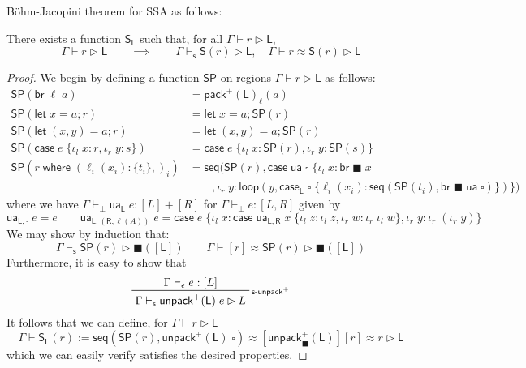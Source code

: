 \documentclass[acmsmall,screen,review]{acmart}
\newcommand{\ms}[1]{\ensuremath{\mathsf{#1}}}
\newcommand{\lto}{:}
\newcommand{\linl}[1]{\iota_l\;{#1}}
\newcommand{\linr}[1]{\iota_r\;{#1}}
\newcommand{\caseexpr}[5]{\ms{case}\;#1\;\{\linl{#2} \lto #3, \linr{#4} \lto #5\}}
\newcommand{\letstmt}[3]{\ensuremath{\ms{let}\;#1 = #2; #3}}
\newcommand{\brb}[2]{\ms{br}\;#1\;#2}
\newcommand{\casestmt}[5]{\ms{case}\;#1\;\{\linl{#2} \lto #3, \linr{#4} \lto #5\}}
\newcommand{\where}[2]{#1\;\ms{where}\;#2}
\newcommand{\wbranch}[3]{#1(#2) \lto \{#3\}}
\newcommand{\rle}[1]{{\scriptsize\textsf{#1}}}
\newcommand{\hasty}[4]{#1 \vdash_{#2} #3: {#4}}
\newcommand{\haslb}[3]{#1 \vdash #2 \rhd #3}
\newcommand{\shaslb}[3]{#1 \vdash_{\ms{s}} #2 \rhd #3}
\newcommand{\teqv}{\approx}
\newcommand{\lbeq}[4]{#1 \vdash #2 \teqv #3 \rhd {#4}}
\newcommand{\invar}{\square}
\newcommand{\outlb}{\blacksquare}
\begin{document}
B\"ohm-Jacopini theorem for SSA as follows:
\begin{theorem}
  There exists a function $\ms{S}_{\ms{L}}$ such that, for all $\haslb{\Gamma}{r}{\ms{L}}$,
  \begin{equation}
    \haslb{\Gamma}{r}{\ms{L}} \qquad \implies \qquad 
      \shaslb{\Gamma}{\ms{S}(r)}{\ms{L}}, \quad \lbeq{\Gamma}{r}{\ms{S}(r)}{\ms{L}}
  \end{equation}
\end{theorem}
\begin{proof}
  We begin by defining a function $\ms{SP}$ on regions $\haslb{\Gamma}{r}{\ms{L}}$ as follows:
  \begin{align*}
    \ms{SP}(\ms{br}\;\ell\;a) &= \ms{pack}^+(\ms{L})_\ell(a) \\
    \ms{SP}(\letstmt{x}{a}{r}) &= \letstmt{x}{a}{\ms{SP}(r)} \\
    \ms{SP}(\letstmt{(x, y)}{a}{r}) &= \letstmt{(x, y)}{a}{\ms{SP}(r)} \\
    \ms{SP}(\casestmt{e}{x}{r}{y}{s}) &= \casestmt{e}{x}{\ms{SP}(r)}{y}{\ms{SP}(s)} \\
    \ms{SP}(\where{r}{(\wbranch{\ell_i}{x_i}{t_i},)_i}) &=
      \ms{seq}(\ms{SP}(r), \caseexpr{\ms{ua}\;\invar}{x}{\brb{\outlb}{x}\\ & \qquad}{y}
        {\ms{loop}(y, 
        \ms{case}_{\ms{L}}\;\invar\;
          \{\ell_i(x_i) : \ms{seq}(\ms{SP}(t_i), \brb{\outlb}{\ms{ua}\;\invar)}\})})
  \end{align*}
  where we have $\hasty{\Gamma}{\bot}{\ms{ua}_{\ms{L}}\;e}{[L] + [R]}$ for
  $\hasty{\Gamma}{\bot}{e}{[L, R]}$ given by
  \begin{equation}
    \ms{ua}_{\ms{L}, \cdot}\;e = e \qquad
    \ms{ua}_{\ms{L}, (\ms{R}, \ell(A))}\;e 
      = \caseexpr{e}{x}{
          \caseexpr{\ms{ua}_{\ms{L}, \ms{R}}\;x}{z}{\iota_l\;z}{w}{\iota_r\;\iota_l\;w}}
          {y}{\iota_r\;(\iota_r\;y)}
  \end{equation}
  We may show by induction that:
  \begin{equation}
    \shaslb{\Gamma}{\ms{SP}(r)}{\outlb([\ms{L}])} \qquad
    \lbeq{\Gamma}{[r]}{\ms{SP}(r)}{\outlb([\ms{L}])}
  \end{equation}
  Furthermore, it is easy to show that
  \begin{equation}
    \prftree[r]{\rle{s-unpack$^+$}}
      {\hasty{\Gamma}{\epsilon}{e}{[L]}}
      {\shaslb{\Gamma}{\ms{unpack}^+(\ms{L})\;e}{L}}
  \end{equation}
  It follows that we can define, for $\haslb{\Gamma}{r}{\ms{L}}$
  \begin{equation}
    \haslb{\Gamma}{\ms{S}_{\ms{L}}(r) 
      := \ms{seq}(\ms{SP}(r), \ms{unpack}^+(\ms{L})\;\invar)
      \teqv [\ms{unpack}^+_\outlb(\ms{L})][r]
      \teqv r
      }{\ms{L}}
  \end{equation}
  which we can easily verify satisfies the desired properties.
\end{proof}
\end{document}
